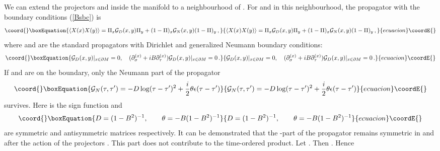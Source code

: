 \documentclass[a4paper,12pt,twoside]{article}
\begin{document}
We can extend the projectors \myHighlight{$\Pi$}\coordHE{} and \coordHE{} inside the manifold
\coordHE{} to a neighbourhood of \coordHE{}. For \coordHE{} and \coordHE{} in this
neighbourhood,
the propagator with the boundary conditions (\ref{Bsbc}) is
\begin{equation}\coord{}\boxEquation{
\langle X (x) X(y) \rangle = \Pi_x {\cal G}_D(x,y) \Pi_y
+(1-\Pi )_x {\cal G}_N(x,y) (1-\Pi )_y \,,  
\label{prop}
}{
\langle X (x) X(y) \rangle = \Pi_x {\cal G}_D(x,y) \Pi_y
+(1-\Pi )_x {\cal G}_N(x,y) (1-\Pi )_y \,,  
}{ecuacion}\coordE{}\end{equation}
where \coordHE{} and \coordHE{} are the standard propagators
with Dirichlet and generalized Neumann boundary conditions:
\begin{equation}\coord{}\boxEquation{
{\cal G}_D(x,y)\vert_{x\in \partial M}=0,\quad
(\partial_\sigma^{(x)} +iB\partial_\tau^{(x)} )
{\cal G}_D(x,y)\vert_{x\in \partial M}=0 \,.\label{DNpro}
}{
{\cal G}_D(x,y)\vert_{x\in \partial M}=0,\quad
(\partial_\sigma^{(x)} +iB\partial_\tau^{(x)} )
{\cal G}_D(x,y)\vert_{x\in \partial M}=0 \,.}{ecuacion}\coordE{}\end{equation}
If \coordHE{} and \coordHE{} are on the boundary, only the Neumann
part of the propagator \cite{Schomerus:1999ug,Seiberg:1999vs}
\begin{equation}\coord{}\boxEquation{
{\cal G}_N(\tau,\tau')=-D \log (\tau -\tau')^2 +\frac i2 \theta
\epsilon (\tau -\tau') \label{Npro}
}{
{\cal G}_N(\tau,\tau')=-D \log (\tau -\tau')^2 +\frac i2 \theta
\epsilon (\tau -\tau') }{ecuacion}\coordE{}\end{equation}
survives. Here \myHighlight{$\epsilon$}\coordHE{} is the sign function and
\begin{equation}\coord{}\boxEquation{
D=(1-B^2)^{-1},\qquad \theta = -B (1-B^2)^{-1} \label{Dtheta}
}{
D=(1-B^2)^{-1},\qquad \theta = -B (1-B^2)^{-1} }{ecuacion}\coordE{}\end{equation}
are symmetric and antisymmetric matrices respectively. It can be
demonstrated that the \coordHE{}-part of the propagator remains
symmetric in \myHighlight{$\tau$}\coordHE{} and \coordHE{} after the action of the
projectors \coordHE{}. This part does not contribute
to the time-ordered product. Let \coordHE{}.
Then \coordHE{}. Hence 
\end{document}
